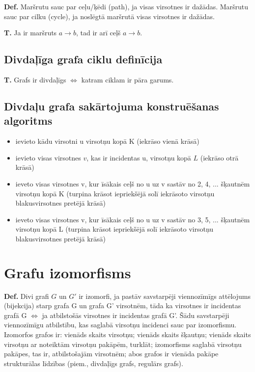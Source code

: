 \documentclass{article}
\begin{document}
\textbf{Def.}  Maršrutu sauc par ceļu/ķēdi (path), ja visas virsotnes ir dažādas.  Maršrutu sauc par cilku (cycle), ja noslēgtā maršrutā visas virsotnes ir dažādas.

\textbf{T.}  Ja ir maršruts $ a \to b$, tad ir arī ceļš $a \to b.$ 

\subsection{Divdaļīga grafa ciklu definīcija}

\textbf{T.}  Grafs ir divdaļīgs $\Leftrightarrow$ katram ciklam ir pāra garums. 

\subsection{Divdaļu grafa sakārtojuma konstruēšanas algoritms}
\begin{itemize}
	\item ievieto kādu virsotni u virsotņu kopā K (iekrāso vienā krāsā)
	\item ievieto visas virsotnes $v$, kas ir incidentas u, virsotņu kopā $L$ (iekrāso otrā krāsā)
	\item ieveto visas virsotnes v, kur īsākais ceļš no u uz v sastāv no 2, 4, ...  šķautnēm virsotņu kopā K (turpina krāsot iepriekšējā solī iekrāsoto virsotņu blakusvirsotnes pretējā krāsā)
	\item ieveto visas virsotnes v, kur īsākais ceļš no u uz v sastāv no 3, 5, ...  šķautnēm virsotņu kopā L (turpina krāsot iepriekšējā solī iekrāsoto virsotņu blakusvirsotnes pretējā krāsā)
\end{itemize}

\section{Grafu izomorfisms}

\textbf{Def.}  Divi grafi $G$ un $G'$ ir izomorfi, ja pastāv savstarpēji viennozīmīgs attēlojums (bijekcija) starp grafa G un grafa G' virsotnēm, tāda ka virsotnes ir incidentas grafā G $\Leftrightarrow$ ja atbilstošās virsotnes ir incidentas grafā G'.  Šādu savstarpēji viennozīmīgu atbilstību, kas saglabā virsotņu incidenci sauc par izomorfismu.  
Izomorfos grafos ir: vienāds skaits virsotņu; vienāds skaits šķautņu; vienāds skaits virsotņu ar noteiktām virsotņu pakāpēm, turklāt; izomorfisms saglabā virsotņu pakāpes, tas ir, atbilstošajām virsotnēm; abos grafos ir vienāda pakāpe strukturālas līdzības (piem., divdaļīgs grafs, regulārs grafs).
\end{document}
